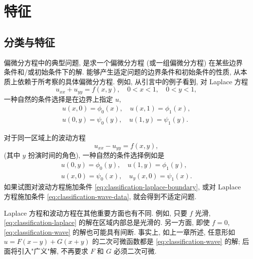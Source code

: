 \section{特征}\label{chap:characteristics}

\subsection{分类与特征}\label{sec:classification-characteristics}

偏微分方程中的典型问题, 是求一个偏微分方程 (或一组偏微分方程) 在某些边界条件和/或初始条件下的解. 能够产生适定问题的边界条件和初始条件的性质, 从本质上依赖于所考察的具体偏微分方程. 例如, 从引言中的例子看到, 对 Laplace 方程
\begin{equation}\label{eq:classification-laplace}
u_{xx}+u_{yy}=f(x,y),\quad0<x<1,\quad0<y<1,
\end{equation}
一种自然的条件选择是在边界上指定 $u$,
\begin{equation}\label{eq:classification-laplace-boundary}
\begin{gathered}
u(x,0)=\phi_0(x),\quad u(x,1)=\phi_1(x),\\
u(0,y)=\psi_0(y),\quad u(1,y)=\psi_1(y).
\end{gathered}
\end{equation}


对于同一区域上的波动方程
\begin{equation}\label{eq:classification-wave}
u_{xx}-u_{yy}=f(x,y),
\end{equation}
(其中 $y$ 扮演时间的角色), 一种自然的条件选择例如是
\begin{equation}\label{eq:classification-wave-data}
\begin{gathered}
u(0,y)=\phi_0(y),\quad u(1,y)=\phi_1(y),\\
u(x,0)=\psi_0(x),\quad u_y(x,0)=\psi_1(x).
\end{gathered}
\end{equation}
如果试图对波动方程施加条件 \eqref{eq:classification-laplace-boundary}, 或对 Laplace 方程施加条件 \eqref{eq:classification-wave-data}, 就会得到不适定问题.

Laplace 方程和波动方程在其他重要方面也有不同. 例如, 只要 $f$ 光滑, \eqref{eq:classification-laplace} 的解在区域内部总是光滑的. 另一方面, 即使 $f=0$, \eqref{eq:classification-wave} 的解也可能具有间断. 事实上, 如上一章所述, 任意形如 $u=F(x-y)+G(x+y)$ 的二次可微函数都是 \eqref{eq:classification-wave} 的解; 后面将引入"广义"解, 不再要求 $F$ 和 $G$ 必须二次可微.

